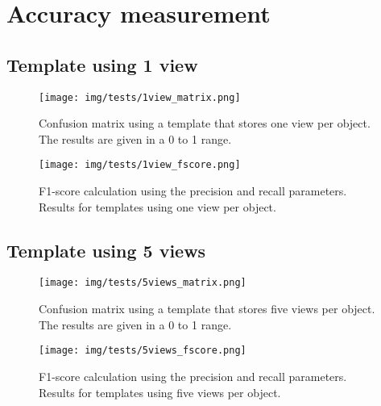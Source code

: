 \section{Accuracy measurement}


\subsection{Template using 1 view}
	\begin{figure}[H]
		\begin{center}
	    \texttt{[image: img/tests/1view\_matrix.png]}
		\caption[Confusion matrix - templates using 1 view]{Confusion matrix using a template that stores one view per object. The results are given in a 0 to 1 range. }
		\label{nodes}
		\end{center}
	\end{figure}

	\begin{figure}[H]
		\begin{center}
		\texttt{[image: img/tests/1view\_fscore.png]}
		\caption[F1-score - templates using 1 view]{F1-score calculation using the precision and recall parameters. Results for templates using one view per object. }
		\label{nodes}
		\end{center}
	\end{figure}




\subsection{Template using 5 views}
	\begin{figure}[H]
		\begin{center}
	    \texttt{[image: img/tests/5views\_matrix.png]}
		\caption[Confusion matrix - templates using 5 views]{Confusion matrix using a template that stores five views per object. The results are given in a 0 to 1 range. }
		\label{nodes}
		\end{center}
	\end{figure}

	\begin{figure}[H]
		\begin{center}
		\texttt{[image: img/tests/5views\_fscore.png]}
		\caption[F1-score - templates using 5 views]{F1-score calculation using the precision and recall parameters. Results for templates using five views per object. }
		\label{nodes}
		\end{center}
	\end{figure}



